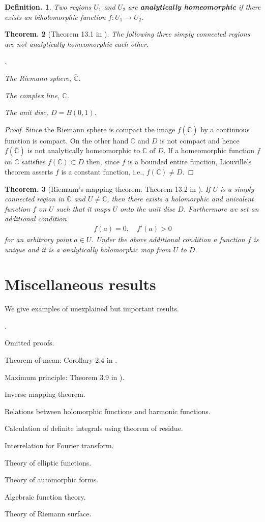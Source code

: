\documentclass[openany, a4paper, oneside]{jsbook}
\newcounter{enum2}
\renewenvironment{enumerate}{%
\begin{list}%
{%
\arabic{enum2}.\ \,%
}%
{%
\usecounter{enum2}
\setlength{\itemindent}{0pt}%
\setlength{\leftmargin}{15pt}%
\setlength{\rightmargin}{0pt}%
\setlength{\labelsep}{0pt}%
\setlength{\labelwidth}{6pt}%
\setlength{\itemsep}{0pt}%
\setlength{\parsep}{0pt}%
\setlength{\listparindent}{0pt}%
}
}{%
\end{list}%
}
\theoremstyle{break}
\theoremstyle{breakdefn}
\newtheorem{thm}{Theorem.}[section]
\newtheorem{defn}[thm]{Definition.}
\newcommand{\bbC}{\mathbb{C}}
\newcommand{\riemannsphere}{\overline{\bbC}}
\begin{document}
\begin{defn}
 Two regions $U_1$ and $U_2$ are \textup{\textbf{analytically homeomorphic}} if
 there exists an biholomorphic function $f \colon U_1 \to U_2$.
\end{defn}
\begin{thm}[Theorem 13.1 in \cite{MitsuoSugiura2}]
 The following three simply connected regions are not analytically homeomorphic each other.
\begin{enumerate}
\item The Riemann sphere, $\riemannsphere$.
\item The complex line, $\bbC$.
\item The unit disc, $D = B (0, 1)$.
\end{enumerate}
\end{thm}
\begin{proof}
Since the Riemann sphere is compact the image $f (\riemannsphere)$ by a continuous function is compact.
On the other hand $\bbC$ and $D$ is not compact and hence $f (\riemannsphere)$ is not
analytically homeomorphic to $\bbC$ of $D$.
If a homeomorphic function $f$ on $\bbC$ satisfies $f (\bbC) \subset D$ then,
since $f$ is a bounded entire function, Liouville's theorem asserts $f$ is a constant function,
i.e., $f (\bbC) \neq D$.
\end{proof}
\begin{thm}[Riemann's mapping theorem. Theorem 13.2 in \cite{MitsuoSugiura2}]
 If $U$ is a simply connected region in $\bbC$ and $U \neq \bbC$, then
 there exists a holomorphic and univalent function $f$ on $U$ such that it maps $U$ onto the unit disc $D$.
 Furthermore we set an additional condition
 \begin{align}
  f (a) = 0, \quad f'(a) > 0
 \end{align}
 for an arbitrary point $a \in U$.
 Under the above additional condition a function $f$ is unique and it is a analytically holomorphic map from $U$ to $D$.
\end{thm}
\section{Miscellaneous results}


We give examples of unexplained but important results.
\begin{enumerate}
\item Omitted proofs.
\item Theorem of mean: Corollary 2.4 in \cite{MitsuoSugiura2}.
\item Maximum principle: Theorem 3.9 in \cite{MitsuoSugiura2}).
\item Inverse mapping theorem.
\item Relations between holomorphic functions and harmonic functions.
\item Calculation of definite integrals using theorem of residue.
\item Interrelation for Fourier transform.
\item Theory of elliptic functions.
\item Theory of automorphic forms.
\item Algebraic function theory.
\item Theory of Riemann surface.
\end{enumerate}
\end{document}
